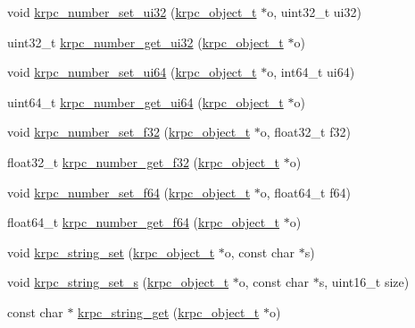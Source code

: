 \begin{DoxyCompactItemize}
\item 
void \hyperlink{group__rpc_gaf864070d7b20a77c9191acbe49f9382f}{krpc\+\_\+number\+\_\+set\+\_\+ui32} (\hyperlink{struct__krpc__object__t}{krpc\+\_\+object\+\_\+t} $\ast$o, uint32\+\_\+t ui32)
\item 
uint32\+\_\+t \hyperlink{group__rpc_gabc1d9560a6f2baf606c4a232488ee76a}{krpc\+\_\+number\+\_\+get\+\_\+ui32} (\hyperlink{struct__krpc__object__t}{krpc\+\_\+object\+\_\+t} $\ast$o)
\item 
void \hyperlink{group__rpc_gafd0da43f7cb46188c6d2f1657b39c3ba}{krpc\+\_\+number\+\_\+set\+\_\+ui64} (\hyperlink{struct__krpc__object__t}{krpc\+\_\+object\+\_\+t} $\ast$o, int64\+\_\+t ui64)
\item 
uint64\+\_\+t \hyperlink{group__rpc_ga951b99916dd94a6d8c5ad335578c35d7}{krpc\+\_\+number\+\_\+get\+\_\+ui64} (\hyperlink{struct__krpc__object__t}{krpc\+\_\+object\+\_\+t} $\ast$o)
\item 
void \hyperlink{group__rpc_ga0e16d4b0c82cb88b148e82bc076a840c}{krpc\+\_\+number\+\_\+set\+\_\+f32} (\hyperlink{struct__krpc__object__t}{krpc\+\_\+object\+\_\+t} $\ast$o, float32\+\_\+t f32)
\item 
float32\+\_\+t \hyperlink{group__rpc_gaa646cc26fc434789e5d4a58ec39a99fa}{krpc\+\_\+number\+\_\+get\+\_\+f32} (\hyperlink{struct__krpc__object__t}{krpc\+\_\+object\+\_\+t} $\ast$o)
\item 
void \hyperlink{group__rpc_ga8aeb77dbdf5aaab4bb75f57ee0ddd8b9}{krpc\+\_\+number\+\_\+set\+\_\+f64} (\hyperlink{struct__krpc__object__t}{krpc\+\_\+object\+\_\+t} $\ast$o, float64\+\_\+t f64)
\item 
float64\+\_\+t \hyperlink{group__rpc_ga000db715b85193d0b6750b46bfc590b5}{krpc\+\_\+number\+\_\+get\+\_\+f64} (\hyperlink{struct__krpc__object__t}{krpc\+\_\+object\+\_\+t} $\ast$o)
\item 
void \hyperlink{group__rpc_ga6985230e52d14d9e6d1f0de75a7c2f93}{krpc\+\_\+string\+\_\+set} (\hyperlink{struct__krpc__object__t}{krpc\+\_\+object\+\_\+t} $\ast$o, const char $\ast$s)
\item 
void \hyperlink{group__rpc_ga478faec6f30727235d29aaeb8d54f22f}{krpc\+\_\+string\+\_\+set\+\_\+s} (\hyperlink{struct__krpc__object__t}{krpc\+\_\+object\+\_\+t} $\ast$o, const char $\ast$s, uint16\+\_\+t size)
\item 
const char $\ast$ \hyperlink{group__rpc_ga4cbbacb71688aa9ee2c5811076132bce}{krpc\+\_\+string\+\_\+get} (\hyperlink{struct__krpc__object__t}{krpc\+\_\+object\+\_\+t} $\ast$o)
\item 

\end{DoxyCompactItemize}
